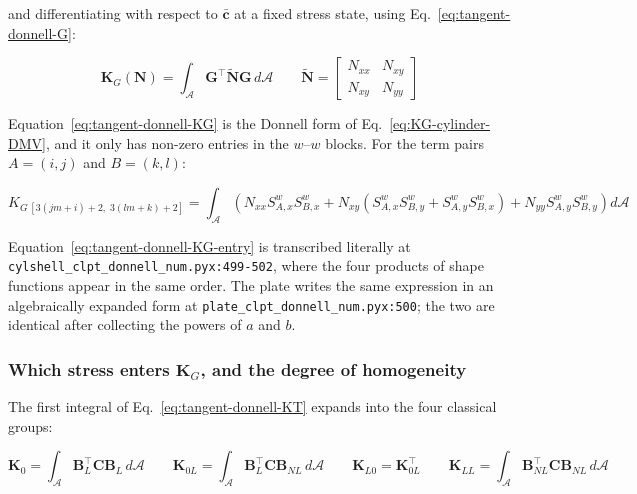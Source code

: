 \noindent and differentiating with respect to $\bar{\boldsymbol{c}}$ at a fixed stress state, using Eq.~\ref{eq:tangent-donnell-G}:

\begin{equation}\label{eq:tangent-donnell-KG}
	\boldsymbol{K}_G(\boldsymbol{N}) = \int_{\mathcal{A}} \boldsymbol{G}^\top \tilde{\boldsymbol{N}} \boldsymbol{G} \, d\mathcal{A}
	\qquad
	\tilde{\boldsymbol{N}} = \begin{bmatrix} N_{xx} & N_{xy} \\ N_{xy} & N_{yy} \end{bmatrix}
\end{equation}

Equation~\ref{eq:tangent-donnell-KG} is the Donnell form of Eq.~\ref{eq:KG-cylinder-DMV}, and it only has non-zero entries in the $w$--$w$ blocks. For the term pairs $A = (i,j)$ and $B = (k,l)$:

\begin{equation}\label{eq:tangent-donnell-KG-entry}
	K_{G\,[3(jm+i)+2,\;3(lm+k)+2]} = \int_{\mathcal{A}} \left( N_{xx} S^w_{A,x} S^w_{B,x} + N_{xy} \left( S^w_{A,x} S^w_{B,y} + S^w_{A,y} S^w_{B,x} \right) + N_{yy} S^w_{A,y} S^w_{B,y} \right) d\mathcal{A}
\end{equation}

Equation~\ref{eq:tangent-donnell-KG-entry} is transcribed literally at \texttt{cylshell\_clpt\_donnell\_num.pyx:499-502}, where the four products of shape functions appear in the same order. The plate writes the same expression in an algebraically expanded form at \texttt{plate\_clpt\_donnell\_num.pyx:500}; the two are identical after collecting the powers of $a$ and $b$.

\subsubsection{Which stress enters $\boldsymbol{K}_G$, and the degree of homogeneity}\label{sec:tangent-donnell-grouping}

The first integral of Eq.~\ref{eq:tangent-donnell-KT} expands into the four classical groups:

\begin{equation}\label{eq:tangent-donnell-K-groups}
	\boldsymbol{K}_0 = \int_{\mathcal{A}} \boldsymbol{B}_L^\top \boldsymbol{C} \boldsymbol{B}_L \, d\mathcal{A} \qquad
	\boldsymbol{K}_{0L} = \int_{\mathcal{A}} \boldsymbol{B}_L^\top \boldsymbol{C} \boldsymbol{B}_{NL} \, d\mathcal{A} \qquad
	\boldsymbol{K}_{L0} = \boldsymbol{K}_{0L}^\top \qquad
	\boldsymbol{K}_{LL} = \int_{\mathcal{A}} \boldsymbol{B}_{NL}^\top \boldsymbol{C} \boldsymbol{B}_{NL} \, d\mathcal{A}
\end{equation}

